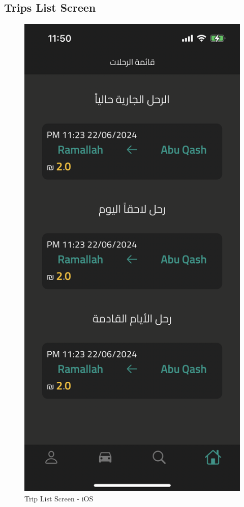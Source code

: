 \documentclass[a4paper, 12pt]{report} %
\begin{document}
        \subsection{Trips List Screen}
            \begin{figure}
                \centering
                \includegraphics[width=\linewidth]{Images/trip_list_screen.png}
                \caption{Trip List Screen - iOS}
                \label{fig:trip_list_screen}
            \end{figure}
\end{document}
